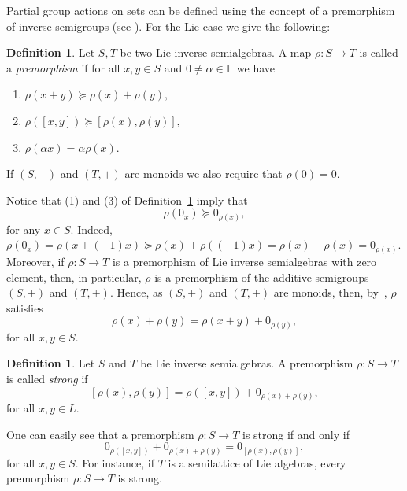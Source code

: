 \documentclass{amsart}
\newcommand{\F}{\mathbb{F}}
\newcommand{\0}{{\vartheta}}
\theoremstyle{definition}
\newtheorem{defn}[thm]{Definition}
\theoremstyle{remark}
\numberwithin{equation}{section}
\newtheorem*{Theorem A}{\textbf{Theorem A}}
\newtheorem*{Corollary E}{\textbf{Corollary E}}
\newtheorem*{Corollary F}{\textbf{Corollary F}}
\newtheorem*{Theorem B}{\textbf{Theorem B}}
\newtheorem*{Theorem C}{\textbf{Theorem C}}
\newtheorem*{Theorem D}{\textbf{Theorem B}}
\newtheorem*{p a}{\textbf{Proof of  Theorem A}}
\newtheorem*{p b}{\textbf{Proof of Theorem B}}
\newtheorem*{p c}{\textbf{Proof of  Theorem C}}
\newtheorem*{p d}{\textbf{Proof of  Theorem D}}
\begin{document}

 Partial group actions on sets can be defined using the concept of a premorphism of inverse semigroups (see \cite{KL}). For the Lie case we give the following:
\begin{defn}\label{def:premorphism}
Let  $S,T$ be two Lie inverse semialgebras. A map $\rho:S\rightarrow T$ is called a {\em premorphism} if for all $x,y\in S$ and $0\neq\alpha\in \F$ we have
\begin{enumerate}
\item $\rho(x+y)\succeq \rho(x)+\rho(y),$
         \item $\rho([x,y])\succeq [\rho(x),\rho(y)],$
         \item $\rho(\alpha x)=\alpha \rho(x)$.  
\end{enumerate}
If  $(S,+)$ and $(T,+)$ are monoids we also require that $\rho(0)=0.$  
\end{defn}

 Notice that (1) and (3) of Definition~\ref{def:premorphism} imply that 
$$\rho (0_x) \succeq 0_{\rho(x)},$$  for any $x\in S.$ Indeed, $ \rho (0_x) = \rho (x + (-1)x) \succeq 
 \rho (x)  + \rho((-1)x)=  \rho (x)  - \rho(x)=
 0_{\rho(x)}.$ Moreover,
if $\rho: S\to T$ is a premorphism of Lie inverse semialgebras with zero element, then, in particular, $\rho$ is a premorphism of the additive semigroups $(S,+)$ and $(T,+)$. Hence, as $(S,+)$ and $(T,+)$ are monoids, then, by~\cite[Proposition 2.1]{KL}, $\rho$ satisfies
\begin{equation}\label{eq-premorphism}
    \rho(x)+\rho(y)=\rho(x+y)+0_{\rho(y)},
\end{equation}
for all $x,y\in S$. 



\begin{defn}\label{strong}
 Let $S$ and $T$ be Lie inverse semialgebras.  
A premorphism $\rho:S \rightarrow T$ is called {\em strong} if
$$ [\rho(x),\rho(y)]=\rho([x,y])+0_{\rho(x)+\rho(y)},
$$ for all $x,y \in L.$  
\end{defn}




One can easily see that  a premorphism  $\rho:S \rightarrow T$ is strong if and only if
\begin{equation}
0_{\rho([x,y])}+0_{\rho(x)+\rho(y)}=0_{[\rho(x),\rho(y)]},
\end{equation}
for all $x,y\in S$. For instance, if $T$ is a semilattice of Lie algebras,  every premorphism $\rho: S\to  T$ is strong. 
\end{document}
